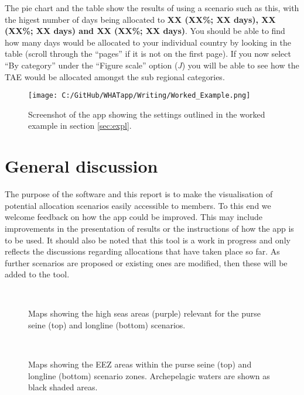 \documentclass[11pt]{article}
\begin{document}
The pie chart and the table show the results of using a scenario such as this, with the higest number of days being allocated to {\bf XX (XX\%; XX days), XX (XX\%; XX days) and XX (XX\%; XX days)}. You should be able to find how many days would be allocated to your individual country by looking in the table (scroll through the ``pages'' if it is not on the first page). If you now select ``By category'' under the ``Figure scale'' option  ({\it J}) you will be able to see how the TAE would be allocated amongst the sub regional categories.

 \begin{figure}[h]
  \centering
\texttt{[image: C:/GitHub/WHATapp/Writing/Worked\_Example.png]}
  \caption {Screenshot of the app showing the settings outlined in the worked example in section \ref{sec:expl}.}
  \label{fig:explapp}
\end{figure}


\section{General discussion}
The purpose of the software and this report is to make the visualisation of potential allocation scenarios easily accessible to members. To this end we welcome feedback on how the app could be improved. This may include improvements in the presentation of results or the instructions of how the app is to be used. It should also be noted that this tool is a work in progress and only reflects the discussions regarding allocations that have taken place so far. As further scenarios are proposed or existing ones are modified, then these will be added to the tool.

\clearpage

 \begin{figure}[!htb]
 \centering

    \\
 \caption{Maps showing the high seas areas (purple) relevant for the purse seine (top) and longline (bottom) scenarios.}\label{fig:HSareasPS}
 \end{figure}


 \begin{figure}[!htb]
 \centering

    \\
 \caption{Maps showing the EEZ areas within the purse seine (top) and longline (bottom) scenario zones. Archepelagic waters are shown as black shaded areas.}\label{fig:areaPS}
 \end{figure}
\end{document}
